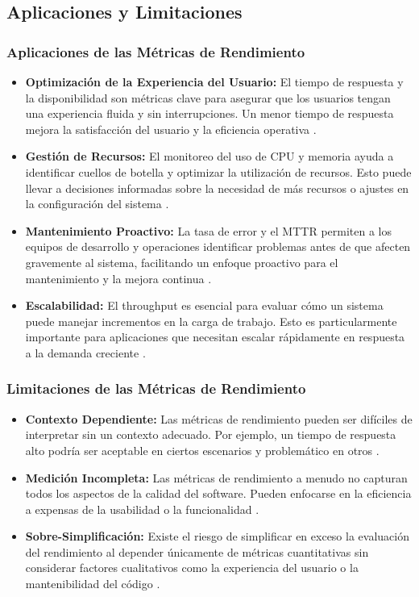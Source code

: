 \documentclass{article}
\begin{document}
\subsection{Aplicaciones y Limitaciones}

\subsubsection{Aplicaciones de las Métricas de Rendimiento}
\begin{itemize}
    \item \textbf{Optimización de la Experiencia del Usuario:} El tiempo de respuesta y la disponibilidad son métricas clave para asegurar que los usuarios tengan una experiencia fluida y sin interrupciones. Un menor tiempo de respuesta mejora la satisfacción del usuario y la eficiencia operativa \parencite{jones2017economics}.
    \item \textbf{Gestión de Recursos:} El monitoreo del uso de CPU y memoria ayuda a identificar cuellos de botella y optimizar la utilización de recursos. Esto puede llevar a decisiones informadas sobre la necesidad de más recursos o ajustes en la configuración del sistema \parencite{scalability2019}.
    \item \textbf{Mantenimiento Proactivo:} La tasa de error y el MTTR permiten a los equipos de desarrollo y operaciones identificar problemas antes de que afecten gravemente al sistema, facilitando un enfoque proactivo para el mantenimiento y la mejora continua \parencite{performance2019}.
    \item \textbf{Escalabilidad:} El throughput es esencial para evaluar cómo un sistema puede manejar incrementos en la carga de trabajo. Esto es particularmente importante para aplicaciones que necesitan escalar rápidamente en respuesta a la demanda creciente \parencite{devsecops2019}.
\end{itemize}

\subsubsection{Limitaciones de las Métricas de Rendimiento}
\begin{itemize}
    \item \textbf{Contexto Dependiente:} Las métricas de rendimiento pueden ser difíciles de interpretar sin un contexto adecuado. Por ejemplo, un tiempo de respuesta alto podría ser aceptable en ciertos escenarios y problemático en otros \parencite{gorton2011essential}.
    \item \textbf{Medición Incompleta:} Las métricas de rendimiento a menudo no capturan todos los aspectos de la calidad del software. Pueden enfocarse en la eficiencia a expensas de la usabilidad o la funcionalidad \parencite{jones2017economics}.
    \item \textbf{Sobre-Simplificación:} Existe el riesgo de simplificar en exceso la evaluación del rendimiento al depender únicamente de métricas cuantitativas sin considerar factores cualitativos como la experiencia del usuario o la mantenibilidad del código \parencite{performance2019}.
\end{itemize}
\end{document}
